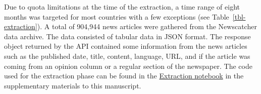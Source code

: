 \documentclass[
]{agujournal2019}
\begin{document}
Due to quota limitations at the time of the extraction, a
time range of eight months was targeted for most countries with a few
exceptions (see Table~\ref{tbl-extraction}). A total of 904,944 news
articles were gathered from the Newscatcher data archive. The data
consisted of tabular data in JSON format. The response object returned
by the API contained some information from the news articles such as the
published date, title, content, language, URL, and if the article was
coming from an opinion column or a regular section of the newspaper. The
code used for the extraction phase can be found in the
\href{https://ctoruno.github.io/eu-rol-tracker/notebooks/0_EU_news_gathering_1-preview.html}{Extraction
notebook} in the supplementary materials to this manuscript.
\end{document}
